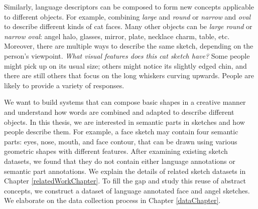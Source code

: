 Similarly, language descriptors can be composed to form new concepts applicable to different objects. For example, combining \textit{large} and \textit{round} or \textit{narrow} and \textit{oval} to describe different kinds of cat faces.
Many other objects can be \textit{large round} or \textit{narrow oval}: angel halo, glasses, mirror, plate, necklace charm, table, etc.
Moreover, there are multiple ways to describe the same sketch, depending on the person's viewpoint. \textit{What visual features does this cat sketch have?} Some people might pick up on its usual size; others might notice its slightly edged chin, and there are still others that focus on the long whiskers curving upwards. People are likely to provide a variety of responses.  

We want to build systems that can compose basic shapes in a creative manner and understand how words are combined and adapted to describe different objects.  
In this thesis, we are interested in semantic parts in sketches and how people describe them. For example, a face sketch may contain four semantic parts: eyes, nose, mouth, and face contour, that can be drawn using various geometric shapes with different features. After examining existing sketch datasets, we found that they do not contain either language annotations or semantic part annotations. We explain the details of related sketch datasets in Chapter \ref{relatedWorkChapter}. To fill the gap and study this reuse of abstract concepts, we construct a dataset of language annotated face and angel sketches. We elaborate on the data collection process in Chapter \ref{dataChapter}.  

